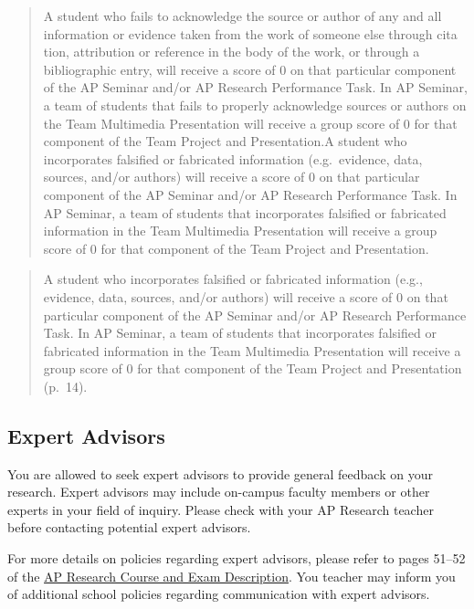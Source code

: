 \documentclass[11pt,]{article}
\begin{document}
\begin{quote}
A student who fails to acknowledge the source or author of any and all information or evidence taken from the work of someone else through cita
tion, attribution or reference in the body of the work, or through a bibliographic entry, will receive a score of 0 on that particular component of the AP Seminar and/or AP Research Performance Task. In AP Seminar, a team of students that fails to properly acknowledge sources or authors on the Team Multimedia Presentation will receive a group score of 0 for that component of the Team Project and Presentation.A student who incorporates falsified or fabricated information (e.g.~evidence, data, sources, and/or authors) will receive a score of 0 on that particular component of the AP Seminar and/or AP Research Performance Task. In AP Seminar, a team of students that incorporates falsified or fabricated information in the Team Multimedia Presentation will receive a group score of 0 for that component of the Team Project and Presentation.
\end{quote}

\begin{quote}
A student who incorporates falsified or fabricated information (e.g., evidence, data, sources, and/or authors) will receive a score of 0 on that particular component of the AP Seminar and/or AP Research Performance Task. In AP Seminar, a team of students that incorporates falsified or fabricated information in the Team Multimedia Presentation will receive a group score of 0 for that component of the Team Project and Presentation (p.~14).
\end{quote}

\hypertarget{expert-advisors}{%
\subsection{Expert Advisors}\label{expert-advisors}}

You are allowed to seek expert advisors to provide general feedback on your research. Expert advisors may include on-campus faculty members or other experts in your field of inquiry. Please check with your AP Research teacher before contacting potential expert advisors.

For more details on policies regarding expert advisors, please refer to pages 51--52 of the \href{https://apcentral.collegeboard.org/pdf/ap-research-course-and-exam-description.pdf}{AP Research Course and Exam Description}. You teacher may inform you of additional school policies regarding communication with expert advisors.
\end{document}
